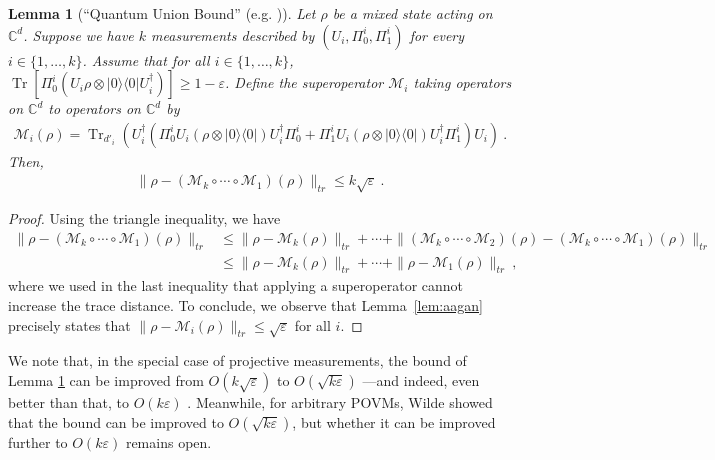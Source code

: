 \documentclass[11pt]{report}
\theoremstyle{plain}
\newtheorem{lemma}[theorem]{Lemma}
\theoremstyle{definition}
\newcommand{\C}{{\mathbb C}}
\newcommand{\eps}{\varepsilon}
\newcommand{\ketbra}[2]{|#1\rangle\!\langle#2|}
\newcommand{\proj}[1]{\ketbra{#1}{#1}}
\newcommand{\Tr}{\operatorname{Tr}}
\begin{document}
\begin{lemma}[``Quantum Union Bound'' (e.g. \cite{aar:qmaqpoly})]
\label{lem:qunionbound}
Let $\rho$ be a mixed state acting on $\C^d$. Suppose we have $k$ measurements described by $(U_i, \Pi_0^i, \Pi_1^i)$ for every $i \in \{1, \dots, k\}$. Assume that for all $i \in \{1, \dots, k\}$, $\Tr[\Pi_0^i (U_i \rho \otimes \proj{0} U_i^{\dagger})] \geq 1-\eps$. Define the superoperator $\mathcal{M}_i$ taking operators on $\C^d$ to operators on $\C^d$ by
\begin{align*}
\mathcal{M}_i(\rho) = \Tr_{d'_i}\left(U_i^{\dagger} \left( \Pi^i_0 U_i (\rho \otimes \proj{0}) U_i^{\dagger} \Pi^i_0  +  \Pi_1^i U_i (\rho \otimes \proj{0}) U_i^{\dagger} \Pi_1^i \right) U_i \right) \ .
\end{align*}
Then,
\begin{align*}
\| \rho - (\mathcal{M}_k \circ \cdots \circ \mathcal{M}_1)(\rho) \|_{tr} \leq k \sqrt{\eps} \ .
\end{align*}
\end{lemma}
\begin{proof}
Using the triangle inequality, we have
\begin{align*}
\| \rho - (\mathcal{M}_k \circ \cdots \circ \mathcal{M}_1)(\rho) \|_{tr}
&\leq \| \rho - \mathcal{M}_k(\rho) \|_{tr} + \cdots + \| (\mathcal{M}_{k} \circ \cdots \circ \mathcal{M}_2)(\rho) - (\mathcal{M}_k \circ \cdots \circ \mathcal{M}_1)(\rho) \|_{tr} \\
&\leq \| \rho - \mathcal{M}_k(\rho) \|_{tr} + \cdots + \| \rho - \mathcal{M}_1(\rho) \|_{tr} \ ,
\end{align*}
where we used in the last inequality that applying a superoperator cannot increase the trace distance. To conclude, we observe that Lemma~\ref{lem:aagan} precisely states that $\| \rho - \mathcal{M}_i(\rho) \|_{tr} \leq \sqrt{\eps}$ for all $i$.
\end{proof}
We note that, in the special case of projective measurements, the bound of Lemma \ref{lem:qunionbound} can be improved from $O(k \sqrt{\eps})$ to $O(\sqrt{k \eps})$ \cite{sen}---and indeed, even better than that, to $O(k \eps)$ \cite{gao}.  Meanwhile, for arbitrary POVMs, Wilde \cite{wilde} showed that the bound can be improved to $O(\sqrt{k \eps})$, but whether it can be improved further to $O(k\eps)$ remains open.
\end{document}
